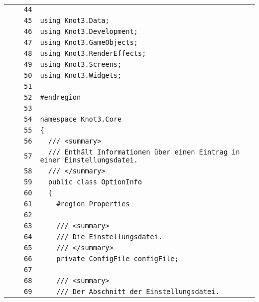 \documentclass[a4paper,10pt]{article}
\begin{document}
\begin{longtable}[l]{lrrl}
\cellcolor{gray} &  & \verb~44~ & \verb~~\\
\cellcolor{gray} &  & \verb~45~ & \verb~using Knot3.Data;~\\
\cellcolor{gray} &  & \verb~46~ & \verb~using Knot3.Development;~\\
\cellcolor{gray} &  & \verb~47~ & \verb~using Knot3.GameObjects;~\\
\cellcolor{gray} &  & \verb~48~ & \verb~using Knot3.RenderEffects;~\\
\cellcolor{gray} &  & \verb~49~ & \verb~using Knot3.Screens;~\\
\cellcolor{gray} &  & \verb~50~ & \verb~using Knot3.Widgets;~\\
\cellcolor{gray} &  & \verb~51~ & \verb~~\\
\cellcolor{gray} &  & \verb~52~ & \verb~#endregion~\\
\cellcolor{gray} &  & \verb~53~ & \verb~~\\
\cellcolor{gray} &  & \verb~54~ & \verb~namespace Knot3.Core~\\
\cellcolor{gray} &  & \verb~55~ & \verb~{~\\
\cellcolor{gray} &  & \verb~56~ & \verb~  /// <summary>~\\
\cellcolor{gray} &  & \verb~57~ & \verb~  /// Enthält Informationen über einen Eintrag in einer Einstellungsdatei.~\\
\cellcolor{gray} &  & \verb~58~ & \verb~  /// </summary>~\\
\cellcolor{gray} &  & \verb~59~ & \verb~  public class OptionInfo~\\
\cellcolor{gray} &  & \verb~60~ & \verb~  {~\\
\cellcolor{gray} &  & \verb~61~ & \verb~    #region Properties~\\
\cellcolor{gray} &  & \verb~62~ & \verb~~\\
\cellcolor{gray} &  & \verb~63~ & \verb~    /// <summary>~\\
\cellcolor{gray} &  & \verb~64~ & \verb~    /// Die Einstellungsdatei.~\\
\cellcolor{gray} &  & \verb~65~ & \verb~    /// </summary>~\\
\cellcolor{gray} &  & \verb~66~ & \verb~    private ConfigFile configFile;~\\
\cellcolor{gray} &  & \verb~67~ & \verb~~\\
\cellcolor{gray} &  & \verb~68~ & \verb~    /// <summary>~\\
\cellcolor{gray} &  & \verb~69~ & \verb~    /// Der Abschnitt der Einstellungsdatei.~\\

\end{longtable}
\end{document}
